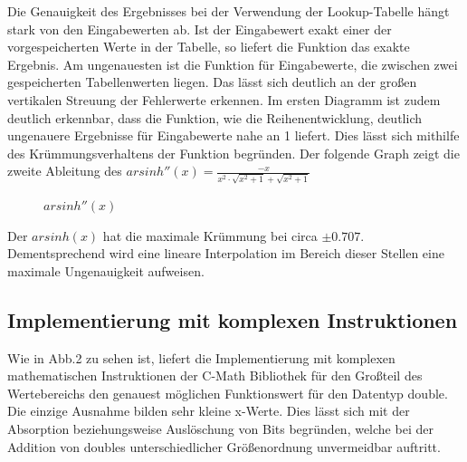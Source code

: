 \documentclass[course=erap] {aspdoc}
\begin{document}
    Die Genauigkeit des Ergebnisses bei der Verwendung der Lookup-Tabelle hängt stark von den Eingabewerten ab. 
    Ist der Eingabewert exakt einer der vorgespeicherten Werte in der Tabelle, so liefert die Funktion das exakte Ergebnis. 
    Am ungenauesten ist die Funktion für Eingabewerte, die zwischen zwei gespeicherten Tabellenwerten liegen.
    Das lässt sich deutlich an der großen vertikalen Streuung der Fehlerwerte erkennen.
    Im ersten Diagramm ist zudem deutlich erkennbar, dass die Funktion, wie die Reihenentwicklung, deutlich ungenauere Ergebnisse für Eingabewerte nahe an 1 liefert.
    Dies lässt sich mithilfe des Krümmungsverhaltens der Funktion begründen. 
    Der folgende Graph zeigt die zweite Ableitung des $arsinh''(x) = \frac{-x}{x^2\cdot \sqrt{x^2+1}+\sqrt{x^2+1}}$
    \begin{figure}
    \caption{$arsinh''(x)$}
    \end{figure}
    

    Der $arsinh(x)$ hat die maximale Krümmung bei circa $\pm 0.707$.
    Dementsprechend wird eine lineare Interpolation im Bereich dieser Stellen eine maximale Ungenauigkeit aufweisen.

    \subsection{Implementierung mit komplexen Instruktionen}\label{subsec:implementierung-mit-komplexen-instruktionen}

    Wie in Abb.2 zu sehen ist, liefert die Implementierung mit komplexen mathematischen Instruktionen der C-Math Bibliothek für den Großteil des Wertebereichs den genauest möglichen Funktionswert für den Datentyp double.
    Die einzige Ausnahme bilden sehr kleine x-Werte.
    Dies lässt sich mit der Absorption beziehungsweise Auslöschung von Bits begründen, welche bei der Addition von doubles unterschiedlicher Größenordnung unvermeidbar auftritt.
\end{document}
